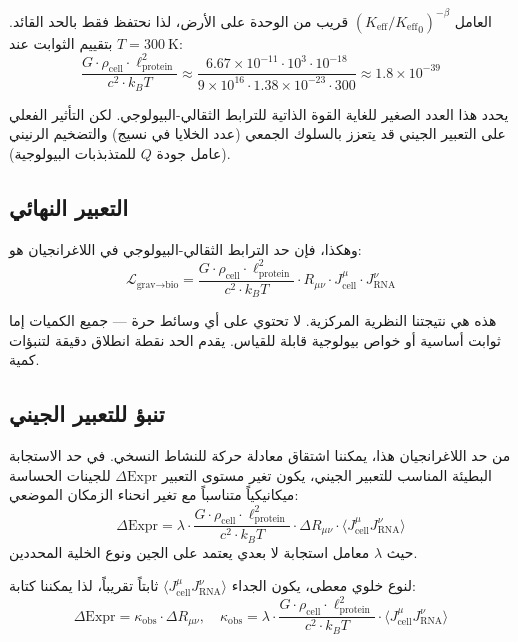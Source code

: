 \documentclass[11pt,a4paper]{article}
\newcommand{\Keff}{K_{\mathrm{eff}}}
\theoremstyle{remark}
\begin{document}
	العامل \((\Keff/{\Keff}_0)^{-\beta}\) قريب من الوحدة على الأرض، لذا نحتفظ فقط بالحد القائد. بتقييم الثوابت عند \(T = 300\ \mathrm{K}\):
	\[
	\frac{G \cdot \rho_{\text{cell}} \cdot \ell_{\text{protein}}^2}{c^2 \cdot k_B T} \approx \frac{6.67\times 10^{-11} \cdot 10^3 \cdot 10^{-18}}{9\times 10^{16} \cdot 1.38\times 10^{-23} \cdot 300} \approx 1.8 \times 10^{-39}
	\]
	
	يحدد هذا العدد الصغير للغاية القوة الذاتية للترابط الثقالي-البيولوجي. لكن التأثير الفعلي على التعبير الجيني قد يتعزز بالسلوك الجمعي (عدد الخلايا في نسيج) والتضخيم الرنيني (عامل جودة \(Q\) للمتذبذبات البيولوجية).
	
	\subsection{التعبير النهائي}
	
	وهكذا، فإن حد الترابط الثقالي-البيولوجي في اللاغرانجيان هو:
	\begin{equation}
		\boxed{ \mathcal{L}_{\text{grav}\to\text{bio}} = \frac{G \cdot \rho_{\text{cell}} \cdot \ell_{\text{protein}}^2}{c^2 \cdot k_B T} \cdot R_{\mu\nu} \cdot J_{\text{cell}}^\mu \cdot J_{\text{RNA}}^\nu }
		\label{eq:final}
	\end{equation}
	
	هذه هي نتيجتنا النظرية المركزية. لا تحتوي على أي وسائط حرة — جميع الكميات إما ثوابت أساسية أو خواص بيولوجية قابلة للقياس. يقدم الحد نقطة انطلاق دقيقة لتنبؤات كمية.
	
	\subsection{تنبؤ للتعبير الجيني}
	
	من حد اللاغرانجيان هذا، يمكننا اشتقاق معادلة حركة للنشاط النسخي. في حد الاستجابة البطيئة المناسب للتعبير الجيني، يكون تغير مستوى التعبير \(\Delta\text{Expr}\) للجينات الحساسة ميكانيكياً متناسباً مع تغير انحناء الزمكان الموضعي:
	\begin{equation}
		\Delta\text{Expr} = \lambda \cdot \frac{G \cdot \rho_{\text{cell}} \cdot \ell_{\text{protein}}^2}{c^2 \cdot k_B T} \cdot \Delta R_{\mu\nu} \cdot \langle J_{\text{cell}}^\mu J_{\text{RNA}}^\nu \rangle
		\label{eq:prediction-raw}
	\end{equation}
	حيث \(\lambda\) معامل استجابة لا بعدي يعتمد على الجين ونوع الخلية المحددين.
	
	لنوع خلوي معطى، يكون الجداء \(\langle J_{\text{cell}}^\mu J_{\text{RNA}}^\nu \rangle\) ثابتاً تقريباً، لذا يمكننا كتابة:
	\begin{equation}
		\Delta\text{Expr} = \kappa_{\text{obs}} \cdot \Delta R_{\mu\nu}, \quad 
		\kappa_{\text{obs}} = \lambda \cdot \frac{G \cdot \rho_{\text{cell}} \cdot \ell_{\text{protein}}^2}{c^2 \cdot k_B T} \cdot \langle J_{\text{cell}}^\mu J_{\text{RNA}}^\nu \rangle
		\label{eq:prediction-simple}
	\end{equation}
	
\end{document}

